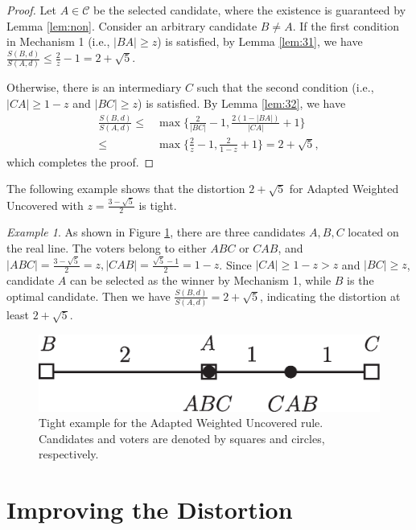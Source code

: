 \documentclass[11pt]{article}
\theoremstyle{remark}
\newtheorem{example}[theorem]{Example}
\begin{document}
\begin{proof}
Let $A\in \mathcal C$ be the selected candidate, where the existence is guaranteed by Lemma \ref{lem:non}. Consider an arbitrary candidate $B\neq A$. If the first condition in Mechanism 1 (i.e., $|BA|\ge z$) is satisfied, by Lemma \ref{lem:31}, we have $\frac{S(B,d)}{S(A,d)}\le \frac{2}{z}-1=2+\sqrt5$.

Otherwise, there is an intermediary $C$ such that the second condition (i.e., $|CA|\ge 1-z$ and $|BC|\ge z$) is satisfied. By Lemma \ref{lem:32}, we have
\begin{align*}
\frac{S(B,d)}{S(A,d)}\le & \max\{\frac{2}{|BC|}-1,\frac{2(1-|BA|)}{|CA|}+1\}\\
\le &\max\{\frac{2}{z}-1, \frac{2}{1-z}+1\}= 2+\sqrt5,\label{eq:max}
\end{align*}
 which completes the proof.
\end{proof}

The following example shows that the distortion $2+\sqrt 5$ for Adapted Weighted Uncovered with $z=\frac{3-\sqrt5}{2}$ is tight.
\begin{example}
As shown in Figure \ref{fig:1}, there are three candidates $A,B,C$ located on the real line. The voters belong to either $ABC$ or $CAB$, and $|ABC|=\frac{3-\sqrt5}{2}=z,|CAB|=\frac{\sqrt5-1}{2}=1-z$. Since $|CA|\ge1-z>z$ and $|BC|\ge z$, candidate $A$ can be selected as the winner by Mechanism 1, while $B$ is the optimal candidate. Then we have $\frac{S(B,d)}{S(A,d)}=2+\sqrt5$, indicating the distortion at least $2+\sqrt5$.

\begin{figure}[htpb]
\begin{center}
\includegraphics[scale=0.3]{awn.eps}
\caption{\label{fig:1} Tight example for the Adapted Weighted Uncovered rule. Candidates and voters are denoted by squares and circles, respectively. }
\end{center}
\end{figure}

\end{example}

\section{Improving the Distortion}\label{sec:im}
\end{document}
